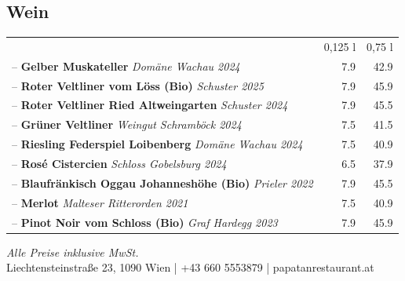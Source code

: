 \documentclass[a4paper,12pt]{article}
\begin{document}
\begin{multicols}{2}
\section*{Wein}
\begin{tabular}{Lrr}
& 0,125 l & 0,75 l\\
-- \textbf{Gelber Muskateller} \emph{Domäne Wachau 2024} & 7.9 & 42.9\\
-- \textbf{Roter Veltliner vom Löss (Bio)} \emph{Schuster 2025} & 7.9 & 45.9\\
-- \textbf{Roter Veltliner Ried Altweingarten} \emph{Schuster 2024} & 7.9 & 45.5\\
-- \textbf{Grüner Veltliner} \emph{Weingut Schramböck 2024} & 7.5 & 41.5\\
-- \textbf{Riesling Federspiel Loibenberg} \emph{Domäne Wachau 2024} & 7.5 & 40.9\\
-- \textbf{Rosé Cistercien} \emph{Schloss Gobelsburg 2024} & 6.5 & 37.9\\
-- \textbf{Blaufränkisch Oggau Johanneshöhe (Bio)} \emph{Prieler 2022} & 7.9 & 45.5\\
-- \textbf{Merlot} \emph{Malteser Ritterorden 2021} & 7.5 & 40.9\\
-- \textbf{Pinot Noir vom Schloss (Bio)} \emph{Graf Hardegg 2023} & 7.9 & 45.9
\end{tabular}

\end{multicols}

\vfill
\begin{center}
    {\small \textit{Alle Preise inklusive MwSt.}}\\
    {\small Liechtensteinstraße 23, 1090 Wien \quad | \quad +43 660 5553879 \quad | \quad papatanrestaurant.at}
\end{center}

\newpage

\end{document}
